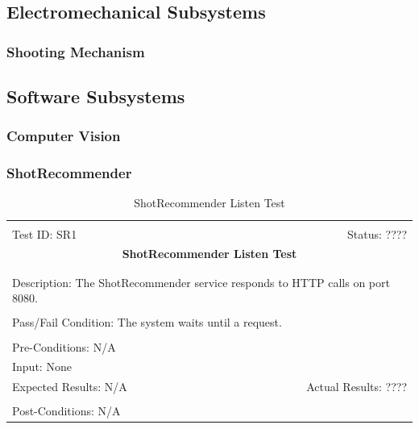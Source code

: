 \documentclass[11pt]{article}
\begin{document}
\subsection{Electromechanical Subsystems}
\subsubsection{Shooting Mechanism}
\subsection{Software Subsystems}
\subsubsection{Computer Vision}
\subsubsection{ShotRecommender}

\begin{center}
\begin{table}[H]
\begin{tabular}{|l r|}\hline&\\[-2mm]
	Test ID: SR1	&Status: ????\\[-3mm]
	\multicolumn{2}{|c|}{\textbf{\large{ShotRecommender Listen Test}}}\\&\\\hline&\\[-3mm]
	\multicolumn{2}{|p{\textwidth}|}{Description: The ShotRecommender service responds to HTTP calls on port 8080.}\\[1mm]\hline&\\[-3mm]
	\multicolumn{2}{|p{\textwidth}|}{Pass/Fail Condition: The system waits until a request.}\\[1mm]\hline&\\[-3mm]
	\multicolumn{2}{|p{\textwidth}|}{Pre-Conditions: N/A}\\[4mm]
	\multicolumn{2}{|p{\textwidth}|}{Input: None}\\[2mm]\hline
	\multicolumn{1}{|p{0.49\textwidth}}{Expected Results: N/A}	&\multicolumn{1}{|p{0.45\textwidth}|}{Actual Results: ????}\\\hline&\\[-3mm]
	\multicolumn{2}{|p{\textwidth}|}{Post-Conditions: N/A}\\\hline
\end{tabular}
\caption{ShotRecommender Listen Test}
\end{table}
\end{center}
\end{document}
